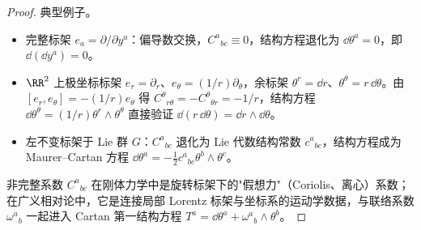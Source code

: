 \begin{proof}
典型例子。
\begin{itemize}
\item 完整标架 $e_a=\partial/\partial y^a$：偏导数交换，$C^a{}_{bc}\equiv0$，结构方程退化为 $\dd\theta^a=0$，即 $\dd(\dd y^a)=0$。
\item $\RR^2$ 上极坐标标架 $e_r=\partial_r$、$e_\theta=(1/r)\partial_\theta$，余标架 $\theta^r=\dd r$、$\theta^\theta=r\,\dd\theta$。由 $[e_r,e_\theta]=-(1/r)e_\theta$ 得 $C^\theta{}_{r\theta}=-C^\theta{}_{\theta r}=-1/r$，结构方程 $\dd\theta^\theta=(1/r)\theta^r\wedge\theta^\theta$ 直接验证 $\dd(r\,\dd\theta)=\dd r\wedge\dd\theta$。
\item 左不变标架于 Lie 群 $G$：$C^a{}_{bc}$ 退化为 Lie 代数结构常数 $c^a{}_{bc}$，结构方程成为 Maurer--Cartan 方程 $\dd\theta^a=-\tfrac12 c^a{}_{bc}\theta^b\wedge\theta^c$。
\end{itemize}

非完整系数 $C^a{}_{bc}$ 在刚体力学中是旋转标架下的"假想力"（Coriolis、离心）系数；在广义相对论中，它是连接局部 Lorentz 标架与坐标系的运动学数据，与联络系数 $\omega^a{}_b$ 一起进入 Cartan 第一结构方程 $T^a=\dd\theta^a+\omega^a{}_b\wedge\theta^b$。
\end{proof}

